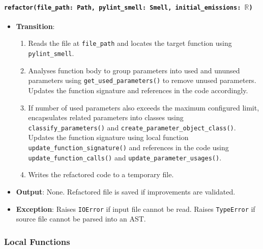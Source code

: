 \documentclass[12pt, titlepage]{article}
\begin{document}
\paragraph{\texttt{refactor(file\_path: Path, pylint\_smell: Smell, initial\_emissions: $\mathbb{R}$)}}
\begin{itemize}
  \item \textbf{Transition}:
  \begin{enumerate}
  \item Reads the file at \texttt{file\_path} and locates the target function using \texttt{pylint\_smell}.
  \item Analyses function body to group parameters into used and ununsed parameters using \texttt{get\_used\_parameters()} to remove unused parameters. Updates the function signature and references in the code accordingly.
  \item If number of used parameters also exceeds the maximum configured limit, encapsulates related parameters into classes using \texttt{classify\_parameters()} and \texttt{create\_parameter\_object\_class()}. Updates the function signature using local function \texttt{update\_function\_signature()} and references in the code  using \texttt{update\_function\_calls()} and \texttt{update\_parameter\_usages()}.
  \item Writes the refactored code to a temporary file.
  \end{enumerate}
  \item \textbf{Output}: None. Refactored file is saved if improvements are validated. 
  \item \textbf{Exception}: Raises \texttt{IOError} if input file cannot be read. Raises \texttt{TypeError} if source file cannot be parsed into an AST.
  \end{itemize}

\subsubsection{Local Functions}
\end{document}
